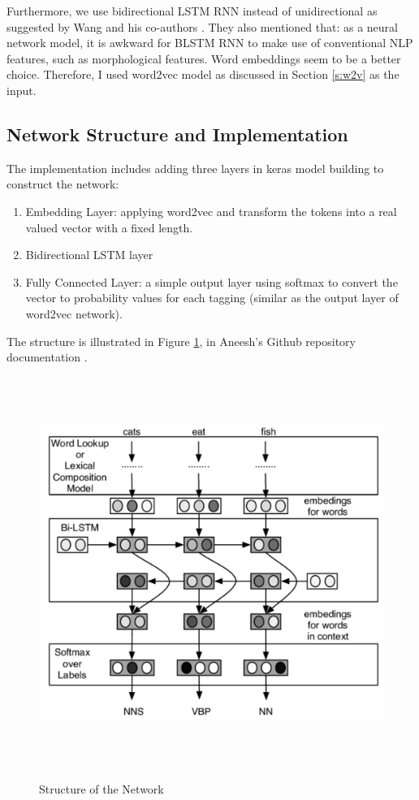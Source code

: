 \documentclass[11pt]{article}
\theoremstyle{plain}
\begin{document}
Furthermore, we use bidirectional LSTM RNN instead of unidirectional as 
suggested by Wang and his co-authors \cite{Wang2015PartofSpeechTW}. 
They also mentioned that: as a neural network model, it is awkward
for BLSTM RNN to make use of conventional NLP features, such as 
morphological features. Word embeddings seem to be a better choice. 
Therefore, I used word2vec model as discussed in Section \ref{s:w2v} as the 
input. 

\subsection{Network Structure and Implementation}
The implementation includes adding three layers in keras model building to 
construct the network: 
\begin{enumerate}
	\item Embedding Layer: applying word2vec and transform the tokens into 
	a real valued vector with a fixed length. 
	\item Bidirectional​ ​LSTM​ ​layer
	\item Fully Connected Layer: a simple output layer using softmax to 
	convert the vector to probability values for each tagging (similar as the 
	output layer of word2vec network).
\end{enumerate}
The structure is illustrated in Figure \ref{f:fullstructure}, in Aneesh's Github 
repository documentation \cite{aneesh-joshi-LSTM-POS-Tagger}.
\begin{figure}[!ht]
	\centering
	\includegraphics[height=5in]{images/POS-structure.png}
	\caption{Structure of the 
	Network}\label{f:fullstructure}\cite{aneesh-joshi-LSTM-POS-Tagger}
\end{figure}
\end{document}
